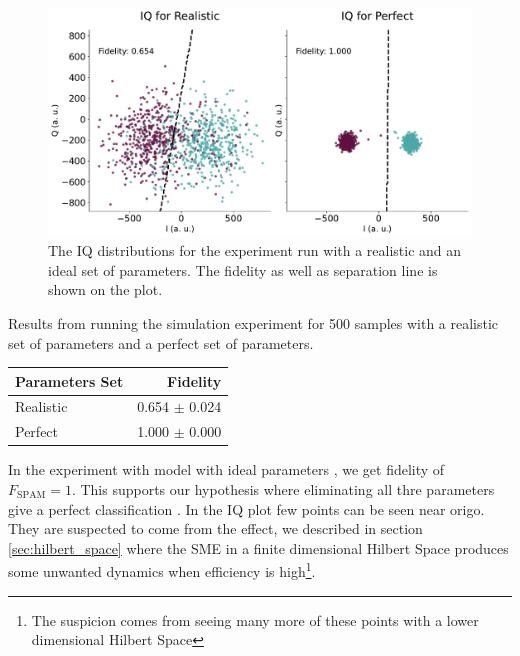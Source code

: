 \begin{figure}
    \centering
    \includegraphics[]{Simulations/budgets/figures/iq_scatter_budgetting_on_off_two.pdf}
    \caption{The IQ distributions for the experiment run with a realistic and an ideal set of parameters. The fidelity as well as separation line is shown on the plot. }
    \label{fig:realistic_perfect_comparison}
\end{figure}

\begin{margintable}[-2 cm]
    \centering
    \caption{Results from running the simulation experiment for 500 samples with a realistic set of parameters and a perfect set of parameters.}
    \begin{tabular}{l|r}
    \hline
         Parameters Set & Fidelity \\ \hline
         Realistic & 0.654 $\pm$ 0.024  \\
         Perfect   & 1.000 $\pm$ 0.000  
    \end{tabular}
    \label{tab:realistic_perfect_comparison}
\end{margintable}
In the experiment with  model with ideal parameters , we get fidelity of $F_{\text{SPAM}} = 1$. This supports our hypothesis where eliminating all thre parameters give a perfect classification . In the IQ plot  few points can be seen near origo. They are suspected to come from the effect, we described in section \ref{sec:hilbert_space} where  the SME in a finite dimensional Hilbert Space produces some unwanted dynamics when efficiency is high\footnote{The suspicion comes from seeing many more of these points with a lower dimensional Hilbert Space}. 


